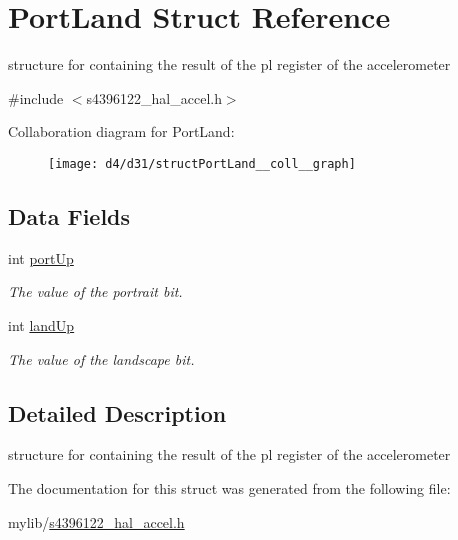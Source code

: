 \hypertarget{structPortLand}{}\section{Port\+Land Struct Reference}
\label{structPortLand}


structure for containing the result of the pl register of the accelerometer  




{\ttfamily \#include $<$s4396122\+\_\+hal\+\_\+accel.\+h$>$}



Collaboration diagram for Port\+Land\+:\nopagebreak
\begin{figure}[H]
\begin{center}
\leavevmode
\texttt{[image: d4/d31/structPortLand\_\_coll\_\_graph]}
\end{center}
\end{figure}
\subsection*{Data Fields}
\begin{DoxyCompactItemize}
\item 
int \hyperlink{structPortLand_a7c3278bf797bd36358b3a3037d80e243}{port\+Up}\hypertarget{structPortLand_a7c3278bf797bd36358b3a3037d80e243}{}\label{structPortLand_a7c3278bf797bd36358b3a3037d80e243}

\begin{DoxyCompactList}\small\item\em The value of the portrait bit. \end{DoxyCompactList}\item 
int \hyperlink{structPortLand_aad6cbd74cd584b602411b466fa87c2ce}{land\+Up}\hypertarget{structPortLand_aad6cbd74cd584b602411b466fa87c2ce}{}\label{structPortLand_aad6cbd74cd584b602411b466fa87c2ce}

\begin{DoxyCompactList}\small\item\em The value of the landscape bit. \end{DoxyCompactList}\end{DoxyCompactItemize}


\subsection{Detailed Description}
structure for containing the result of the pl register of the accelerometer 

The documentation for this struct was generated from the following file\+:\begin{DoxyCompactItemize}
\item 
mylib/\hyperlink{s4396122__hal__accel_8h}{s4396122\+\_\+hal\+\_\+accel.\+h}\end{DoxyCompactItemize}
